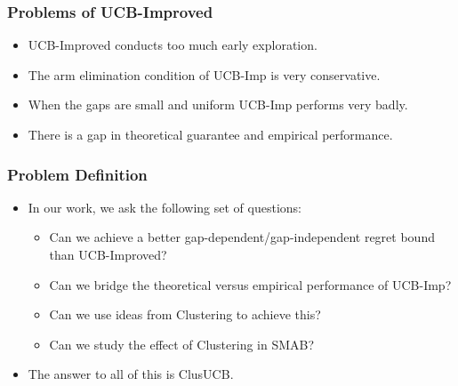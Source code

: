\begin{frame}
\frametitle{Problems of UCB-Improved}
\begin{itemize}
\item<1-> UCB-Improved conducts too much early exploration.
\item<2-> The arm elimination condition of UCB-Imp is very conservative.
\item<3-> When the gaps are small and uniform UCB-Imp performs very badly.
\item<4-> There is a gap in theoretical guarantee and empirical performance.  
\end{itemize}
\end{frame}

\begin{frame}
\frametitle{Problem Definition}
\begin{itemize}
\item<1-> In our work, we ask the following set of questions:
\begin{itemize}
\item<2-> Can we achieve a better gap-dependent/gap-independent regret bound than UCB-Improved?
\item<3-> Can we bridge the theoretical versus empirical performance of UCB-Imp?
\item<4-> Can we use ideas from Clustering to achieve this?
\item<5-> Can we study the effect of Clustering in SMAB? 
\end{itemize} 
\item<6-> The answer to all of this is ClusUCB.
\end{itemize}
\end{frame}
